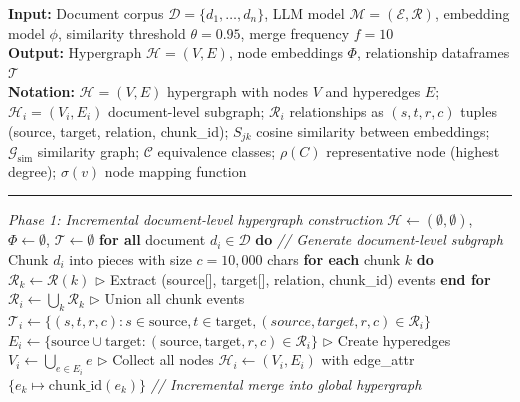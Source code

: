 \documentclass{article}
\begin{document}
\begin{algorithm}
\caption{LLM-guided hypergraph construction with incremental merging}
\label{alg:llm_hypergraph}
\textbf{Input:} Document corpus $\mathcal{D} = \{d_1, \ldots, d_n\}$, LLM model $\mathcal{M} = (\mathcal{E}, \mathcal{R})$, embedding model $\phi$, similarity threshold $\theta = 0.95$, merge frequency $f = 10$\\
\textbf{Output:} Hypergraph $\mathcal{H} = (V, E)$, node embeddings $\Phi$, relationship dataframes $\mathcal{T}$\\
\textbf{Notation:} $\mathcal{H} = (V, E)$ hypergraph with nodes $V$ and hyperedges $E$; $\mathcal{H}_i = (V_i, E_i)$ document-level subgraph; $\mathcal{R}_i$ relationships as $(s,t,r,c)$ tuples (source, target, relation, chunk\_id); $S_{jk}$ cosine similarity between embeddings; $\mathcal{G}_{\text{sim}}$ similarity graph; $\mathcal{C}$ equivalence classes; $\rho(C)$ representative node (highest degree); $\sigma(v)$ node mapping function
\vspace{2mm}
\hrule
\vspace{2mm}
\begin{algorithmic}[1]
\STATE \emph{Phase 1: Incremental document-level hypergraph construction}
\vspace{0.5mm}
\STATE $\mathcal{H} \leftarrow (\emptyset, \emptyset)$, $\Phi \leftarrow \emptyset$, $\mathcal{T} \leftarrow \emptyset$
\STATE \textbf{for all} document $d_i \in \mathcal{D}$ \textbf{do}
\STATE \quad \textit{// Generate document-level subgraph}
\STATE \quad Chunk $d_i$ into pieces with size $c = 10{,}000$ chars
\STATE \quad \textbf{for each} chunk $k$ \textbf{do}
\STATE \quad \quad $\mathcal{R}_k \leftarrow \mathcal{R}(k)$ \hfill $\triangleright$ Extract (source[], target[], relation, chunk\_id) events
\STATE \quad \textbf{end for}
\STATE \quad $\mathcal{R}_i \leftarrow \bigcup_k \mathcal{R}_k$ \hfill $\triangleright$ Union all chunk events
\STATE \quad $\mathcal{T}_i \leftarrow \{(s, t, r, c) : s \in \text{source}, t \in \text{target}, (source, target, r, c) \in \mathcal{R}_i\}$
\STATE \quad $E_i \leftarrow \{\text{source} \cup \text{target} : (\text{source}, \text{target}, r, c) \in \mathcal{R}_i\}$ \hfill $\triangleright$ Create hyperedges
\STATE \quad $V_i \leftarrow \bigcup_{e \in E_i} e$ \hfill $\triangleright$ Collect all nodes
\STATE \quad $\mathcal{H}_i \leftarrow (V_i, E_i)$ with edge\_attr $\{e_k \mapsto \text{chunk\_id}(e_k)\}$
\vspace{1mm}
\STATE \quad \textit{// Incremental merge into global hypergraph}

\end{algorithmic}
\end{algorithm}
\end{document}
